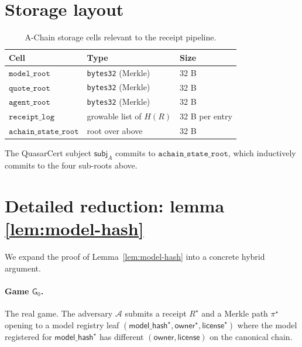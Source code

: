 \documentclass[11pt]{article}
\begin{document}
\section{Storage layout}
\label{sec:layout}

\begin{table}[h]
\centering
\caption{A-Chain storage cells relevant to the receipt pipeline.}
\begin{tabular}{lll}
\toprule
Cell & Type & Size \\
\midrule
$\texttt{model\_root}$        & \texttt{bytes32} (Merkle)   & 32 B \\
$\texttt{quote\_root}$        & \texttt{bytes32} (Merkle)   & 32 B \\
$\texttt{agent\_root}$        & \texttt{bytes32} (Merkle)   & 32 B \\
$\texttt{receipt\_log}$       & growable list of $H(R)$     & 32 B per entry \\
$\texttt{achain\_state\_root}$ & root over above            & 32 B \\
\bottomrule
\end{tabular}
\end{table}

The QuasarCert subject $\mathsf{subj}_A$ commits to
$\texttt{achain\_state\_root}$, which inductively commits to the
four sub-roots above.

\section{Detailed reduction: lemma \ref{lem:model-hash}}
\label{sec:reduct-model}

We expand the proof of Lemma~\ref{lem:model-hash} into a concrete
hybrid argument.

\paragraph{Game $\mathsf{G}_0$.} The real game.  The adversary
$\mathcal{A}$ submits a receipt $R^\star$ and a Merkle path
$\pi^\star$ opening to a model registry leaf
$(\mathsf{model\_hash}^\star, \mathsf{owner}^\star,
  \mathsf{license}^\star)$ where the model registered for
$\mathsf{model\_hash}^\star$ has different
$(\mathsf{owner}, \mathsf{license})$ on the canonical chain.
\end{document}
